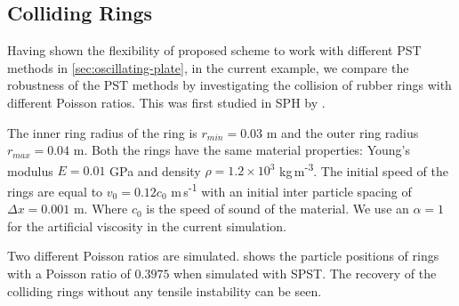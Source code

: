 \documentclass[preprint,12pt]{elsarticle}
\begin{document}
%
%
\FloatBarrier%
\subsection{Colliding Rings}
\label{colliding-rings}

Having shown the flexibility of proposed scheme to work with different PST
methods in \cref{sec:oscillating-plate}, in the current example, we compare
the robustness of the PST methods by investigating the collision of rubber
rings with different Poisson ratios. This was first studied in SPH by
\citet{swegle1995smoothed}.

The inner ring radius of the ring is $r_{min} = 0.03$ m and the outer ring
radius $r_{max} = 0.04$ m. Both the rings have the same material properties:
Young's modulus $E = 0.01$ GPa and density $\rho = 1.2 \times 10^{3}$
 kg\,m\textsuperscript{-3}. The initial speed of the rings are equal to
$v_0 = 0.12 c_0$ m\,s\textsuperscript{-1} with an initial inter particle spacing of
$\Delta x = 0.001$ m. Where $c_0$ is the speed of sound of the material. We use
an $\alpha=1$ for the artificial viscosity in the current simulation.

Two different Poisson ratios are simulated. 
shows the particle positions of rings with a Poisson ratio of $0.3975$ when
simulated with SPST. The recovery of the colliding rings without any tensile
instability can be seen.
\end{document}
